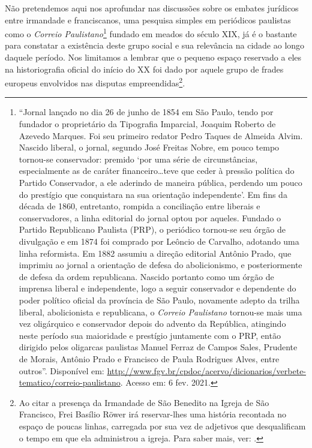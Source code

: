 \begin{refsection}
    Não pretendemos aqui nos aprofundar nas discussões sobre os embates jurídicos entre irmandade e franciscanos, uma pesquisa simples em periódicos paulistas como o \textit{Correio Paulistano}\footnote{``Jornal lançado no dia 26 de junho de 1854 em São Paulo, tendo por fundador o proprietário da Tipografia Imparcial, Joaquim Roberto de Azevedo Marques. Foi seu primeiro redator Pedro Taques de Almeida Alvim. Nascido liberal, o jornal, segundo José Freitas Nobre, em pouco tempo tornou-se conservador: premido `por uma série de circunstâncias, especialmente as de caráter financeiro\dots teve que ceder à pressão política do Partido Conservador, a ele aderindo de maneira pública, perdendo um pouco do prestígio que conquistara na sua orientação independente'. Em fins da década de 1860, entretanto, rompida a conciliação entre liberais e conservadores, a linha editorial do jornal optou por aqueles. Fundado o Partido Republicano Paulista (PRP), o periódico tornou-se seu órgão de divulgação e em 1874 foi comprado por Leôncio de Carvalho, adotando uma linha reformista. Em 1882 assumiu a direção editorial Antônio Prado, que imprimiu ao jornal a orientação de defesa do abolicionismo, e posteriormente de defesa da ordem republicana. Nascido portanto como um órgão de imprensa liberal e independente, logo a seguir conservador e dependente do poder político oficial da província de São Paulo, novamente adepto da trilha liberal, abolicionista e republicana, o \textit{Correio Paulistano} tornou-se mais uma vez oligárquico e conservador depois do advento da República, atingindo neste período sua maioridade e prestígio juntamente com o PRP, então dirigido pelos oligarcas paulistas Manuel Ferraz de Campos Sales, Prudente de Morais, Antônio Prado e Francisco de Paula Rodrigues Alves, entre outros''. Disponível em: \url{http://www.fgv.br/cpdoc/acervo/dicionarios/verbete-tematico/correio-paulistano}. Acesso em: 6 fev. 2021.} fundado em meados do século XIX, já é o bastante para constatar a existência deste grupo social e sua relevância na cidade ao longo daquele período. Nos limitamos a lembrar que o pequeno espaço reservado a eles na historiografia oficial do início do XX foi dado por aquele grupo de frades europeus envolvidos nas disputas empreendidas\footnote{Ao citar a presença da Irmandade de São Benedito na Igreja de São Francisco, Frei Basílio Röwer irá reservar-lhes uma história recontada no espaço de poucas linhas, carregada por sua vez de adjetivos que desqualificam o tempo em que ela administrou a igreja. Para saber mais, ver: .}.


\end{refsection}

